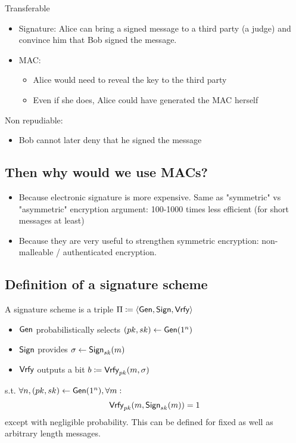 \documentclass[12pt]{article}
\begin{document}
Transferable
\begin{itemize}
	\item Signature: Alice can bring a signed message to a third party (a judge) and convince him that Bob signed the message.
	\item MAC:
	\begin{itemize}
		\item Alice would need to reveal the key to the third party
		\item Even if she does, Alice could have generated the MAC herself
	\end{itemize}
\end{itemize}

Non repudiable:
\begin{itemize}
	\item Bob cannot later deny that he signed the message
\end{itemize}

\subsection*{Then why would we use MACs? }



\begin{itemize}
	\item Because electronic signature is more expensive. Same as "symmetric" vs "asymmetric" 	encryption argument: 100-1000 times less efficient (for short messages at least)
	\item Because they are very useful to strengthen symmetric encryption: non-malleable / 		authenticated encryption.
\end{itemize}

\subsection{Definition of a signature scheme}
A signature scheme is a triple $\Pi \coloneqq \langle \operatorname{\mathsf{Gen}}, \operatorname{\mathsf{Sign}}, \operatorname{\mathsf{Vrfy}} \rangle$
\begin{itemize}
	\item $\operatorname{\mathsf{Gen}}$ probabilistically selects $(pk,sk) \leftarrow \operatorname{\mathsf{Gen}}(1^n)$
	\item $\operatorname{\mathsf{Sign}}$ provides $\sigma \leftarrow \operatorname{\mathsf{Sign}}_{sk}(m)$
	\item $\operatorname{\mathsf{Vrfy}}$ outputs a bit $b \coloneqq \operatorname{\mathsf{Vrfy}}_{pk}(m,\sigma)$
\end{itemize}

s.t. $\forall n, (pk,sk)\leftarrow \operatorname{\mathsf{Gen}}(1^n), \forall m:$
\begin{equation*}
\operatorname{\mathsf{Vrfy}}_{pk}(m, \operatorname{\mathsf{Sign}}_{sk}(m))=1
\end{equation*}
except with negligible probability. This can be defined for fixed as well as arbitrary length messages.
\newpage
\end{document}
